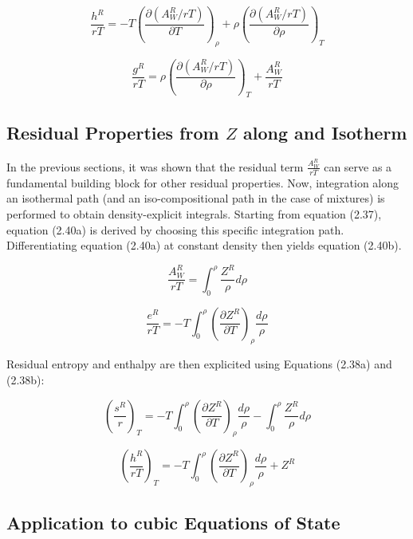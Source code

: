 \begin{equation}
	\frac{h^R}{rT} = -T \left(\frac{\partial(A_W^R/rT)}{\partial T}\right)_\rho + \rho\left(\frac{\partial(A^R_W/rT)}{\partial\rho}\right)_T
\end{equation}

\begin{equation}
	\frac{g^R}{rT} = \rho\left(\frac{\partial(A^R_W/rT)}{\partial\rho}\right)_T + \frac{A^R_W}{rT}
\end{equation}

\subsection{Residual Properties from $Z$ along and Isotherm}

In the previous sections, it was shown that the residual term $\frac{A_W^R}{rT}$ can
serve as a fundamental building block for other residual properties. Now,
integration along an isothermal path (and an iso-compositional path in the case
of mixtures) is performed to obtain density-explicit integrals. Starting from
equation (2.37), equation (2.40a) is derived by choosing this specific
integration path. Differentiating equation (2.40a) at constant density then
yields equation (2.40b).

\begin{equation}
	\frac{A^R_W}{rT} = \int_0^\rho\frac{Z^R}{\rho}d\rho
\end{equation}

\begin{equation}
	\frac{e^R}{rT} = -T\int_0^\rho\left(\frac{\partial Z^R}{\partial T}\right)_\rho\frac{d\rho}{\rho}
\end{equation}

Residual entropy and enthalpy are then explicited using Equations (2.38a) and
(2.38b):

\begin{equation}
	\left(\frac{s^R}{r}\right)_T = -T\int_0^\rho\left(\frac{\partial Z^R}{\partial T}\right)_\rho\frac{d\rho}{\rho} - \int_0^\rho\frac{Z^R}{\rho}d\rho 
\end{equation}

\begin{equation}
	\left(\frac{h^R}{rT}\right)_T = -T\int_0^\rho\left(\frac{\partial Z^R}{\partial T}\right)_\rho\frac{d\rho}{\rho} + Z^R
\end{equation}

\subsection{Application to cubic Equations of State}

